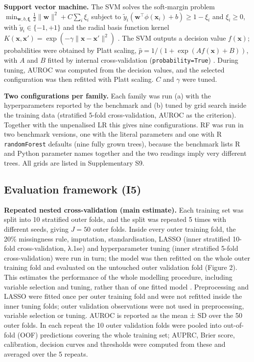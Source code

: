 \textbf{Support vector machine.} The SVM solves the soft-margin problem
\(\min_{\mathbf{w}, b, \boldsymbol\xi} \tfrac{1}{2}\lVert\mathbf{w}\rVert^2 + C\sum_i \xi_i\)
subject to \(\tilde y_i(\mathbf{w}^\top\phi(\mathbf{x}_i) + b) \ge 1 - \xi_i\)
and \(\xi_i \ge 0\), with \(\tilde y_i \in \{-1, +1\}\) and the radial basis
function kernel
\(K(\mathbf{x}, \mathbf{x}') = \exp(-\gamma\lVert\mathbf{x} - \mathbf{x}'\rVert^2)\)
\parencite{cortes1995}. The SVM outputs a decision value \(f(\mathbf{x})\);
probabilities were obtained by Platt scaling,
\(\hat p = 1/(1 + \exp(A f(\mathbf{x}) + B))\), with \(A\) and \(B\) fitted by
internal cross-validation (\texttt{probability=True}) \parencite{platt1999}.
During tuning, AUROC was computed from the decision values, and the selected
configuration was then refitted with Platt scaling. \(C\) and \(\gamma\) were
tuned.

\textbf{Two configurations per family.} Each family was run (a) with the
hyperparameters reported by the benchmark and (b) tuned by grid search inside
the training data (stratified 5-fold cross-validation, AUROC as the criterion).
Together with the unpenalised LR this gives nine configurations. RF was run in
two benchmark versions, one with the literal parameters and one with R
\texttt{randomForest} defaults (nine fully grown trees), because the benchmark
lists R and Python parameter names together and the two readings imply very
different trees. All grids are listed in Supplementary S9.

\hypertarget{evaluation-framework-i5}{%
\subsection{Evaluation framework (I5)}\label{evaluation-framework-i5}}

\textbf{Repeated nested cross-validation (main estimate).} Each training set was
split into 10 stratified outer folds, and the split was repeated 5 times with
different seeds, giving \(J = 50\) outer folds. Inside every outer training
fold, the 20\% missingness rule, imputation, standardisation, LASSO (inner
stratified 10-fold cross-validation, λ.1se) and hyperparameter tuning (inner
stratified 5-fold cross-validation) were run in turn; the model was then
refitted on the whole outer training fold and evaluated on the untouched outer
validation fold (Figure 2). This estimates the performance of the whole
modelling procedure, including variable selection and tuning, rather than of one
fitted model \parencite{varma2006,cawley2010}. Preprocessing and LASSO were
fitted once per outer training fold and were not refitted inside the inner
tuning folds; outer validation observations were not used in preprocessing,
variable selection or tuning. AUROC is reported as the mean ± SD over the 50
outer folds. In each repeat the 10 outer validation folds were pooled into
out-of-fold (OOF) predictions covering the whole training set; AUPRC, Brier
score, calibration, decision curves and thresholds were computed from these and
averaged over the 5 repeats.

